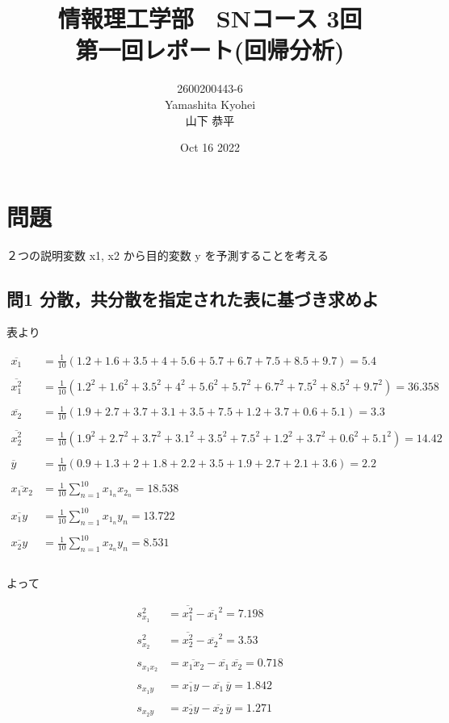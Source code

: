 \documentclass[dvipdfmx,autodetect-engine,titlepage]{jsarticle}
\title{情報理工学部　SNコース 3回\\
第一回レポート(回帰分析)\\}
\author{2600200443-6\\Yamashita Kyohei\\山下 恭平}
\date{Oct 16 2022}
\begin{document}
\maketitle

\section*{問題}

２つの説明変数 x1, x2 から目的変数 y を予測することを考える

\subsection*{問1 分散，共分散を指定された表に基づき求めよ}

表より

\begin{align*}
  \overline{x_1} &= \frac{1}{10}(1.2+1.6+3.5+4+5.6+5.7+6.7+7.5+8.5+9.7) = 5.4\\\\
  \overline{x_{1}^2} &= \frac{1}{10}(1.2^2+1.6^2+3.5^2+4^2+5.6^2+5.7^2+6.7^2+7.5^2+8.5^2+9.7^2) = 36.358\\\\
  \overline{x_2} &= \frac{1}{10}(1.9+2.7+3.7+3.1+3.5+7.5+1.2+3.7+0.6+5.1) = 3.3\\\\
  \overline{x_{2}^2} &= \frac{1}{10}(1.9^2+2.7^2+3.7^2+3.1^2+3.5^2+7.5^2+1.2^2+3.7^2+0.6^2+5.1^2) = 14.42\\\\
  \overline{y} &= \frac{1}{10}(0.9+1.3+2+1.8+2.2+3.5+1.9+2.7+2.1+3.6) = 2.2\\\\
  \overline{x_{1}x_2} &= \frac{1}{10} \sum_{n = 1}^{10} x_{1_n}x_{2_n} = 18.538\\\\
  \overline{x_{1}y} &= \frac{1}{10} \sum_{n = 1}^{10} x_{1_n}y_n = 13.722\\\\
  \overline{x_{2}y} &= \frac{1}{10} \sum_{n = 1}^{10} x_{2_n}y_n = 8.531\\\\
\end{align*}

よって


\begin{align*}
  s_{x_1}^2 &= \overline{x_{1}^2} - \overline{x_1}^2 = 7.198 \\\\
  s_{x_2}^2 &= \overline{x_{2}^2} - \overline{x_2}^2 = 3.53 \\\\
  s_{x_{1}x_{2}} &=  \overline{x_{1}x_2} - \overline{x_1}\,\overline{x_2} = 0.718 \\\\
  s_{x_{1}y} &=  \overline{x_{1}y} - \overline{x_1}\,\overline{y} = 1.842 \\\\
  s_{x_{2}y} &=  \overline{x_{2}y} - \overline{x_2}\,\overline{y} = 1.271
\end{align*}
\end{document}
